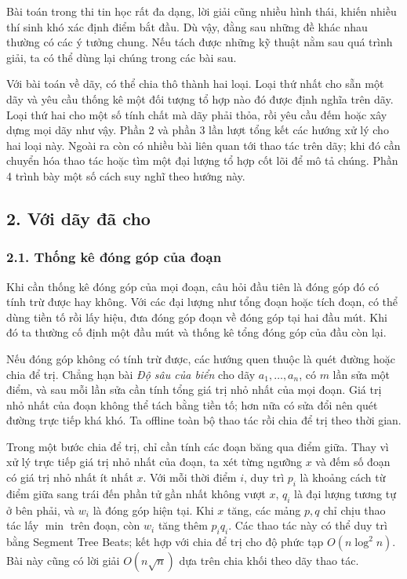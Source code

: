 \documentclass[11pt]{article}
\begin{document}
Bài toán trong thi tin học rất đa dạng, lời giải cũng nhiều hình thái, khiến
nhiều thí sinh khó xác định điểm bắt đầu. Dù vậy, đằng sau những đề khác nhau
thường có các ý tưởng chung. Nếu tách được những kỹ thuật nằm sau quá trình
giải, ta có thể dùng lại chúng trong các bài sau.

Với bài toán về dãy, có thể chia thô thành hai loại. Loại thứ nhất cho sẵn một
dãy và yêu cầu thống kê một đối tượng tổ hợp nào đó được định nghĩa trên dãy.
Loại thứ hai cho một số tính chất mà dãy phải thỏa, rồi yêu cầu đếm hoặc xây
dựng mọi dãy như vậy. Phần 2 và phần 3 lần lượt tổng kết các hướng xử lý cho
hai loại này. Ngoài ra còn có nhiều bài liên quan tới thao tác trên dãy; khi đó
cần chuyển hóa thao tác hoặc tìm một đại lượng tổ hợp cốt lõi để mô tả chúng.
Phần 4 trình bày một số cách suy nghĩ theo hướng này.

\subsection*{2. Với dãy đã cho}

\subsubsection*{2.1. Thống kê đóng góp của đoạn}

Khi cần thống kê đóng góp của mọi đoạn, câu hỏi đầu tiên là đóng góp đó có
tính trừ được hay không. Với các đại lượng như tổng đoạn hoặc tích đoạn, có thể
dùng tiền tố rồi lấy hiệu, đưa đóng góp đoạn về đóng góp tại hai đầu mút. Khi
đó ta thường cố định một đầu mút và thống kê tổng đóng góp của đầu còn lại.

Nếu đóng góp không có tính trừ được, các hướng quen thuộc là quét đường hoặc
chia để trị. Chẳng hạn bài \emph{Độ sâu của biển} cho dãy \(a_1,\ldots,a_n\),
có \(m\) lần sửa một điểm, và sau mỗi lần sửa cần tính tổng giá trị nhỏ nhất
của mọi đoạn. Giá trị nhỏ nhất của đoạn không thể tách bằng tiền tố; hơn nữa
có sửa đổi nên quét đường trực tiếp khá khó. Ta offline toàn bộ thao tác rồi
chia để trị theo thời gian.

Trong một bước chia để trị, chỉ cần tính các đoạn băng qua điểm giữa. Thay vì
xử lý trực tiếp giá trị nhỏ nhất của đoạn, ta xét từng ngưỡng \(x\) và đếm số
đoạn có giá trị nhỏ nhất ít nhất \(x\). Với mỗi thời điểm \(i\), duy trì
\(p_i\) là khoảng cách từ điểm giữa sang trái đến phần tử gần nhất không vượt
\(x\), \(q_i\) là đại lượng tương tự ở bên phải, và \(w_i\) là đóng góp hiện
tại. Khi \(x\) tăng, các mảng \(p,q\) chỉ chịu thao tác lấy \(\min\) trên đoạn,
còn \(w_i\) tăng thêm \(p_iq_i\). Các thao tác này có thể duy trì bằng Segment
Tree Beats; kết hợp với chia để trị cho độ phức tạp \(O(n\log^2 n)\). Bài này
cũng có lời giải \(O(n\sqrt n)\) dựa trên chia khối theo dãy thao tác.
\end{document}
